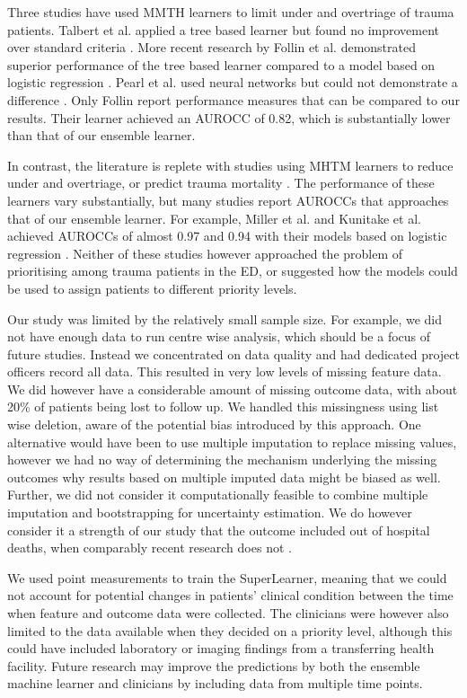 \documentclass[10pt,letterpaper]{article}\usepackage[]{graphicx}\usepackage[]{color}
\begin{document}
Three studies have used MMTH learners to limit under and overtriage of trauma
patients.  Talbert et al. applied a tree based learner but found no improvement
over standard criteria \cite{Talbert2007}. More recent research by Follin et
al. demonstrated superior performance of the tree based learner compared to a
model based on logistic regression \cite{Follin2016}. Pearl et al. used neural
networks but could not demonstrate a difference \cite{Pearl2008}. Only Follin
report performance measures that can be compared to our results. Their learner
achieved an AUROCC of 0.82, which is substantially lower than that of our
ensemble learner.

In contrast, the literature is replete with studies using MHTM learners to
reduce under and overtriage, or predict trauma mortality \cite{Rehn2011,
  DeMunter2017,VanRein2018}. The performance of these learners vary
substantially, but many studies report AUROCCs that approaches that of our
ensemble learner. For example, Miller et al. and Kunitake et al. achieved
AUROCCs of almost 0.97 and 0.94 with their models based on logistic regression
\cite{Miller2017}. Neither of these studies however approached the problem of
prioritising among trauma patients in the ED, or suggested how the models could
be used to assign patients to different priority levels.

Our study was limited by the relatively small sample size. For example, we did
not have enough data to run centre wise analysis, which should be a focus of
future studies. Instead we concentrated on data quality and had dedicated
project officers record all data. This resulted in very low levels of missing
feature data. We did however have a considerable amount of missing outcome data,
with about 20\% of patients being lost to follow up. We handled this missingness
using list wise deletion, aware of the potential bias introduced by this
approach. One alternative would have been to use multiple imputation to replace
missing values, however we had no way of determining the mechanism underlying
the missing outcomes why results based on multiple imputed data might be biased
as well. Further, we did not consider it computationally feasible to combine
multiple imputation and bootstrapping for uncertainty estimation. We do however
consider it a strength of our study that the outcome included out of hospital
deaths, when comparably recent research does not \cite{Levin2018, Kunitake2018}.

We used point measurements to train the SuperLearner, meaning that we could
not account for potential changes in patients' clinical condition between the
time when feature and outcome data were collected. The clinicians were however
also limited to the data available when they decided on a priority level,
although this could have included laboratory or imaging findings from a
transferring health facility. Future research may improve the predictions by
both the ensemble machine learner and clinicians by including data from multiple
time points.
\end{document}
